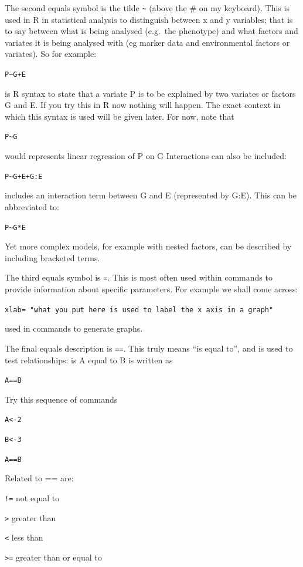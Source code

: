 \documentclass[
]{book}
\begin{document}
The second equals symbol is the tilde \texttt{\textasciitilde{}} (above the \# on my keyboard). This is used in R in statistical analysis to distinguish between x and y variables; that is to say between what is being analysed (e.g.~the phenotype) and what factors and variates it is being analysed with (eg marker data and environmental factors or variates). So for example:

\texttt{P\textasciitilde{}G+E}

is R syntax to state that a variate P is to be explained by two variates or factors G and E. If you try this in R now nothing will happen. The exact context in which this syntax is used will be given later. For now, note that

\texttt{P\textasciitilde{}G}

would represents linear regression of P on G Interactions can also be included:

\texttt{P\textasciitilde{}G+E+G:E}

includes an interaction term between G and E (represented by G:E). This can be abbreviated to:

\texttt{P\textasciitilde{}G*E}

Yet more complex models, for example with nested factors, can be described by including bracketed terms.

The third equals symbol is \texttt{=}. This is most often used within commands to provide information about specific parameters. For example we shall come across:

\texttt{xlab=\ "what\ you\ put\ here\ is\ used\ to\ label\ the\ x\ axis\ in\ a\ graph"}

used in commands to generate graphs.

The final equals description is \texttt{==}. This truly means ``is equal to'', and is used to test relationships: is A equal to B is written as

\texttt{A==B}

Try this sequence of commands

\texttt{A\textless{}-2}

\texttt{B\textless{}-3}

\texttt{A==B}

Related to == are:

\texttt{!=} not equal to

\texttt{\textgreater{}} greater than

\texttt{\textless{}} less than

\texttt{\textgreater{}=} greater than or equal to
\end{document}
